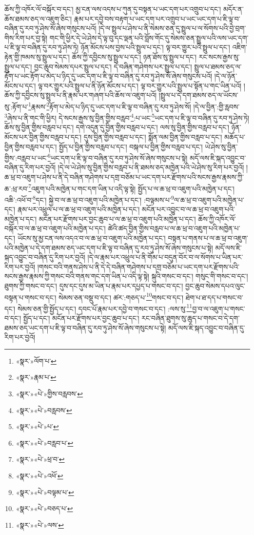 ཆོས་ཀྱི་འཁོར་ལོ་བསྐོར་བ་དང་། མྱ་ངན་ལས་འདས་པ་ཀུན་དུ་བསྟན་པ་ཡང་དག་པར་འགྲུབ་པ་དང་། མདོར་ན་ཆོས་ཐམས་ཅད་ལ་འཇུག་ཅིང་། རྣམ་པར་དབྱེ་བས་བརྟག་པ་ཡང་དག་པར་འགྲུབ་པ་ཡང་ཡང་དག་པ་ཇི་ལྟ་བ་བཞིན་དུ་རབ་ཏུ་ཤེས་སོ་ཞེས་གསུངས་པའོ། །དེ་ལ་སྤྲུལ་པ་ཤེས་པ་ནི་སེམས་ཅན་དུ་སྤྲུལ་པ་ལ་སོགས་པའི་བྱེ་བྲག་གིས་རིག་པར་བྱ་སྟེ། གང་གི་ཕྱིར་དེ་ཡེ་ཤེས་དེ་ལྟ་བུ་དང་ལྡན་པའི་བློས་གོང་དུ་སེམས་ཅན་སྤྲུལ་པའི་ལས་ཡང་དག་པ་ཇི་ལྟ་བ་བཞིན་དུ་རབ་ཏུ་ཤེས་ཏེ། ཉོན་མོངས་པས་བྱས་པའི་སྤྲུལ་པ་དང་། ལྟ་བར་གྱུར་པའི་སྤྲུལ་པ་དང་། འཇིག་རྟེན་གྱི་ཁམས་སུ་སྤྲུལ་པ་དང་། ཆོས་ཀྱི་དབྱིངས་སུ་སྤྲུལ་པ་དང་། ཉན་ཐོས་སུ་སྤྲུལ་པ་དང་། རང་སངས་རྒྱས་སུ་སྤྲུལ་པ་དང་། བྱང་ཆུབ་སེམས་དཔར་སྤྲུལ་པ་དང་། དེ་བཞིན་གཤེགས་པར་སྤྲུལ་པ་དང་། སྤྲུལ་པ་ཐམས་ཅད་ལ་རྟོག་པ་ཡང་རྟོག་པ་མེད་པ་ཉིད་དུ་ཡང་དག་པ་ཇི་ལྟ་བ་བཞིན་དུ་རབ་ཏུ་ཤེས་སོ་ཞེས་གསུངས་པའོ། །དེ་ལ་ཉོན་མོངས་པ་དང་། ལྟ་བར་གྱུར་པའི་སྤྲུལ་པ་ནི་ཉོན་མོངས་པ་དང་། ལྟ་བར་གྱུར་པའི་སྤྲུལ་པ་སྟོན་པ་གང་ཡིན་པའོ། །ཆོས་ཀྱི་དབྱིངས་སུ་སྤྲུལ་པ་ནི་རྣམ་པར་གཞག་པའི་ཆོས་ལ་འཇུག་པའོ། །སྤྲུལ་པ་དེ་དག་ཐམས་ཅད་ལ་ཡོངས་སུ་:རྟོག་པ་\footnote{«སྣར་»ལོག་པ་}རྣམས་\footnote{«སྣར་»རྣམ་པ་}རྟོག་པ་མེད་པ་ཉིད་དུ་ཡང་དག་པ་ཇི་ལྟ་བ་བཞིན་དུ་རབ་ཏུ་ཤེས་སོ། །དེ་ལ་བྱིན་:གྱི་རླབས་\footnote{«སྣར་»«པེ་»གྱིས་བརླབས་}ཞེས་པ་ནི་གང་གི་ཕྱིར། དེ་སངས་རྒྱས་སུ་བྱིན་གྱིས་བརླབ་\footnote{«སྣར་»«པེ་»བརླབས་}:པ་ཡང་\footnote{«སྣར་»«པེ་»པ་}ཡང་དག་པ་ཇི་ལྟ་བ་བཞིན་དུ་རབ་ཏུ་ཤེས་ཏེ། ཆོས་སུ་བྱིན་གྱིས་བརླབ་པ་དང་། དགེ་འདུན་དུ་བྱིན་གྱིས་བརླབ་པ་དང་། ལས་སུ་བྱིན་གྱིས་བརླབ་པ་དང་། ཉོན་མོངས་པར་བྱིན་གྱིས་བརླབ་པ་དང་། དུས་བྱིན་གྱིས་བརླབ་པ་དང་། སྨོན་ལམ་བྱིན་གྱིས་བརླབ་པ་དང་། མཆོད་པ་བྱིན་གྱིས་བརླབ་པ་དང་། སྤྱོད་པ་བྱིན་གྱིས་བརླབ་པ་དང་། བསྐལ་པ་བྱིན་གྱིས་བརླབ་པ་དང་། ཡེ་ཤེས་སུ་བྱིན་གྱིས་:བརླབ་པ་ཡང་\footnote{«སྣར་»«པེ་»བརླབ་པ་}ཡང་དག་པ་ཇི་ལྟ་བ་བཞིན་དུ་རབ་ཏུ་ཤེས་སོ་ཞེས་གསུངས་པ་སྟེ། མདོ་ལས་ཇི་སྐད་འབྱུང་བ་བཞིན་དུ་རིག་པར་བྱའོ། །དེ་ལ་ཡེ་ཤེས་སུ་བྱིན་གྱིས་བརླབ་པ་ནི་ཐམས་ཅད་མཁྱེན་པའི་ཡེ་ཤེས་སུ་རིག་པར་བྱའོ། །ཆ་ཕྲ་བ་འཇུག་པ་ཤེས་པ་ནི་དེ་བཞིན་གཤེགས་པ་དགྲ་བཅོམ་པ་ཡང་དག་པར་རྫོགས་པའི་སངས་རྒྱས་རྣམས་ཀྱི་ཆ་:ཕྲ་རབ་\footnote{«སྣར་»«པེ་»ཕྲ་བ་}འཇུག་པའི་མཁྱེན་པ་གང་དག་ཡིན་པ་འདི་ལྟ་སྟེ། སྤྱོད་པ་ལ་ཆ་ཕྲ་བ་འཇུག་པའི་མཁྱེན་པ་དང་། འཆི་:འཕོ་བ་\footnote{«སྣར་»«པེ་»འཕོ་}དང་། སྐྱེ་བ་ལ་ཆ་ཕྲ་བ་འཇུག་པའི་མཁྱེན་པ་དང་། :བལྟམས་པ་\footnote{«སྣར་»«པེ་»བལྟམ་པ་}ལ་ཆ་ཕྲ་བ་འཇུག་པའི་མཁྱེན་པ་དང་། རྣམ་པར་འཕྲུལ་པ་ལ་ཆ་ཕྲ་བ་འཇུག་པའི་མཁྱེན་པ་དང་། མངོན་པར་འབྱུང་བ་ལ་ཆ་ཕྲ་བ་འཇུག་པའི་མཁྱེན་པ་དང་། མངོན་པར་རྫོགས་པར་བྱང་ཆུབ་པ་ལ་ཆ་ཕྲ་བ་འཇུག་པའི་མཁྱེན་པ་དང་། ཆོས་ཀྱི་འཁོར་ལོ་བསྐོར་བ་ལ་ཆ་ཕྲ་བ་འཇུག་པའི་མཁྱེན་པ་དང་། ཚེའི་ཚད་བྱིན་གྱིས་བརླབ་པ་ལ་ཆ་ཕྲ་བ་འཇུག་པའི་མཁྱེན་པ་དང་། ཡོངས་སུ་མྱ་ངན་ལས་འདའ་བ་ལ་ཆ་ཕྲ་བ་འཇུག་པའི་མཁྱེན་པ་དང་། བསྟན་པ་གནས་པ་ལ་ཆ་ཕྲ་བ་འཇུག་པའི་མཁྱེན་པ་དེ་དག་ཐམས་ཅད་ཡང་དག་པ་ཇི་ལྟ་བ་བཞིན་དུ་རབ་ཏུ་ཤེས་སོ་ཞེས་གསུངས་པ་སྟེ། མདོ་ལས་ཇི་སྐད་འབྱུང་བ་བཞིན་དུ་རིག་པར་བྱའོ། །དེ་ལ་རྣམ་པར་འཕྲུལ་པ་ནི་གོམ་པ་བདུན་བོར་བ་ལ་སོགས་པ་ཡིན་པར་རིག་པར་བྱའོ། །གསང་བའི་གནས་ཤེས་པ་ནི་དེ་དེ་བཞིན་གཤེགས་པ་དགྲ་བཅོམ་པ་ཡང་དག་པར་རྫོགས་པའི་སངས་རྒྱས་རྣམས་ཀྱི་གསང་བའི་གནས་གང་དག་ཡིན་པ་འདི་ལྟ་སྟེ། སྐུའི་གསང་བ་དང་། གསུང་གི་གསང་བ་དང་། ཐུགས་ཀྱི་གསང་བ་དང་། དུས་དང་དུས་མ་ཡིན་པ་རྣམ་པར་དཔྱད་པ་གསང་བ་དང་། བྱང་ཆུབ་སེམས་དཔའ་ལུང་བསྟན་པ་གསང་བ་དང་། སེམས་ཅན་བསྡུ་བ་དང་། ཚར་:གཅད་པ་\footnote{«སྣར་»«པེ་»བཅད་པ་}གསང་བ་དང་། ཐེག་པ་ཐ་དད་པ་གསང་བ་དང་། སེམས་ཅན་གྱི་སྤྱོད་པ་དང་། དབང་པོ་རྣམ་པར་དབྱེ་བ་གསང་བ་དང་། :ལས་སུ་\footnote{«སྣར་»«པེ་»ལས་}བྱ་བ་ལ་འཇུག་པ་གསང་བ་དང་། སྤྱོད་པ་དང་། མངོན་པར་རྫོགས་པར་བྱང་ཆུབ་པ་དང་། རང་བཞིན་ཐུགས་སུ་ཆུད་པ་གསང་བ་དེ་དག་ཐམས་ཅད་ཡང་དག་པ་ཇི་ལྟ་བ་བཞིན་དུ་རབ་ཏུ་ཤེས་སོ་ཞེས་གསུངས་པ་སྟེ། མདོ་ལས་ཇི་སྐད་འབྱུང་བ་བཞིན་དུ་རིག་པར་བྱའོ། 